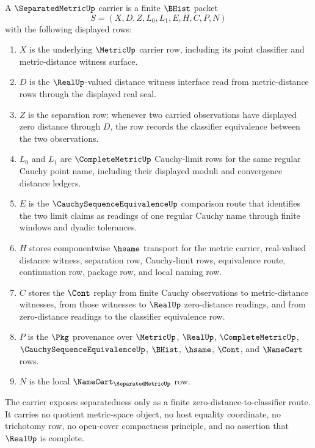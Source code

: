 \begin{definition}\label{def:separatedmetric-carrier}
A $\SeparatedMetricUp$ carrier is a finite $\BHist$ packet
$$
S=(X,D,Z,L_0,L_1,E,H,C,P,N)
$$
with the following displayed rows:
\begin{enumerate}
\item $X$ is the underlying $\MetricUp$ carrier row, including its point classifier and metric-distance witness surface.
\item $D$ is the $\RealUp$-valued distance witness interface read from metric-distance rows through the displayed real seal.
\item $Z$ is the separation row: whenever two carried observations have displayed zero distance through $D$, the row records the classifier equivalence between the two observations.
\item $L_0$ and $L_1$ are $\CompleteMetricUp$ Cauchy-limit rows for the same regular Cauchy point name, including their displayed moduli and convergence distance ledgers.
\item $E$ is the $\CauchySequenceEquivalenceUp$ comparison route that identifies the two limit claims as readings of one regular Cauchy name through finite windows and dyadic tolerances.
\item $H$ stores componentwise $\hsame$ transport for the metric carrier, real-valued distance witness, separation row, Cauchy-limit rows, equivalence route, continuation row, package row, and local naming row.
\item $C$ stores the $\Cont$ replay from finite Cauchy observations to metric-distance witnesses, from those witnesses to $\RealUp$ zero-distance readings, and from zero-distance readings to the classifier equivalence row.
\item $P$ is the $\Pkg$ provenance over $\MetricUp$, $\RealUp$, $\CompleteMetricUp$, $\CauchySequenceEquivalenceUp$, $\BHist$, $\hsame$, $\Cont$, and $\NameCert$ rows.
\item $N$ is the local $\NameCert_{\SeparatedMetricUp}$ row.
\end{enumerate}
The carrier exposes separatedness only as a finite zero-distance-to-classifier route. It carries no quotient metric-space object, no host equality coordinate, no trichotomy row, no open-cover compactness principle, and no assertion that $\RealUp$ is complete.
\end{definition}


